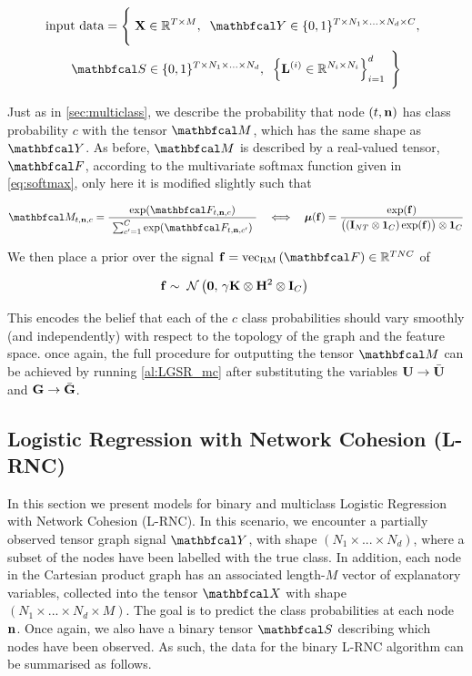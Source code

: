 \begin{multline*}
    \text{input data} = \Bigg\{\;\X \in \R^{T \times M}, \;\; \Yt \in \{0, 1\}^{T \times N_1 \times ... \times N_d \times C}, \;\; \\ 
    \St \in \{0, 1\}^{T \times N_1 \times ... \times N_d} , \;\; \left\{\LL^{(i)} \in \R^{N_i \times N_i}\right\}_{i=1}^d \; \Bigg\}
\end{multline*}

Just as in \cref{sec:multiclass}, we describe the probability that node $(t, \mathbf{n})$ has class probability $c$ with the tensor $\Mt$, which has the same shape as $\Yt$. As before, $\Mt$ is described by a real-valued tensor, $\Ft$, according to the multivariate softmax function given in \cref{eq:softmax}, only here it is modified slightly such that 

\begin{equation}
    \label{eq:softmax2}
    \Mt_{t, \nn, c} = \frac{\exp(\Ft_{t, \nn, c})}{ \raisebox{-0.1cm} { $\sum_{c'=1}^C \exp(\Ft_{t, \nn, c'})$ }}  \quad \Longleftrightarrow \quad \muu(\f) = \frac{\exp(\f)}{ \big((\I_{NT} \otimes \one_C) \exp(\f)\big) \otimes \one_C}
\end{equation}

We then place a prior over the signal $\f = \vecrm{\Ft} \in \R^{TNC}$ of

\begin{equation}
    \mathbf{f} \sim \; \mathcal{N}\left(\mathbf{0}, \, \gamma \mathbf{K} \otimes \mathbf{H}^2 \otimes \mathbf{I}_C\right) \;
\end{equation}

This encodes the belief that each of the $c$ class probabilities should vary smoothly (and independently) with respect to the topology of the graph and the feature space. once again, the full procedure for outputting the tensor $\Mt$ can be achieved by running \cref{al:LGSR_mc} after substituting the variables $\mathbf{U} \rightarrow \bar{\mathbf{U}}$ and $\mathbf{G} \rightarrow \bar{\mathbf{G}}$. 


\subsection{Logistic Regression with Network Cohesion (L-RNC) }

\label{sec:lrnc}

In this section we present models for binary and multiclass Logistic Regression with Network Cohesion (L-RNC). In this scenario, we encounter a partially observed tensor graph signal $\Yt$, with shape $(N_1 \times ... \times N_d)$, where a subset of the nodes have been labelled with the true class. In addition, each node in the Cartesian product graph has an associated length-$M$ vector of explanatory variables, collected into the tensor $\Xt$ with shape $(N_1 \times ... \times N_d \times M)$. The goal is to predict the class probabilities at each node $\mathbf{n}$. Once again, we also have a binary tensor $\St$ describing which nodes have been observed. As such, the data for the binary L-RNC algorithm can be summarised as follows. 

